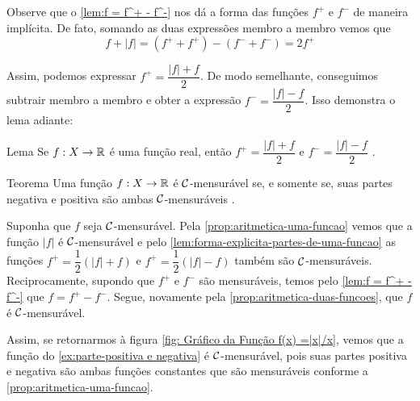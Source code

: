 Observe que o \ref{lem:f = f^+ - f^-} nos dá a forma das funções $f^+$ e $f^-$ de maneira implícita.
De fato, somando as duas expressões membro a membro vemos que
\vspace{-0.2cm}
$$f + |f| = (f^+ + f^+) - (f^- + f^-) = 2f^+$$

\vspace{-0.2cm}
Assim, podemos expressar $f^+ = \dfrac{|f| + f}{2}$.
De modo semelhante, conseguimos subtrair membro a membro e obter a expressão $f^- = \dfrac{|f| - f}{2}$. 
Isso demonstra o lema adiante:
\begin{env}{Lema}
\label{lem:forma-explicita-partes-de-uma-funcao}
    Se $f: X \to \mathbb{R}$ é uma função real, então $f^+ = \dfrac{|f| + f}{2}$ e $f^- = \dfrac{|f| - f}{2}$ \cite{bartle}.
    \vspace{-0.2cm}
\end{env}
\begin{env}{Teorema}
    Uma função $f: X \to \mathbb{R}$ é $\operatorname{\mathcal{C}}$-mensurável se, e somente se, suas partes negativa e positiva são ambas $\operatorname{\mathcal{C}}$-mensuráveis \cite{bartle}. 
    \vspace{-0.2cm}
\end{env}
    \begin{prova}
        Suponha que $f$ seja $\operatorname{\mathcal{C}}$-mensurável.
        Pela  \ref{prop:aritmetica-uma-funcao} vemos que a função $|f|$ é $\operatorname{\mathcal{C}}$-mensurável e pelo \ref{lem:forma-explicita-partes-de-uma-funcao} as funções $f^+ = \dfrac{1}{2}(|f| + f)$ e $f^+ = \dfrac{1}{2}(|f| - f)$ também são $\operatorname{\mathcal{C}}$-mensuráveis.
        Reciprocamente, supondo que $f^+$ e $f^-$ são mensuráveis, temos pelo \ref{lem:f = f^+ - f^-} que
        $f = f^+ - f^-$. Segue, novamente pela \ref{prop:aritmetica-duas-funcoes}, que $f$ é $\operatorname{\mathcal{C}}$-mensurável. 
    \end{prova}

Assim, se retornarmos à figura \ref{fig: Gráfico da Função f(x) =|x|/x}, vemos que a função do  \ref{ex:parte-positiva e negativa} é $\operatorname{\mathcal{C}}$-mensurável, pois
suas partes positiva e negativa são ambas funções constantes que são mensuráveis conforme a \ref{prop:aritmetica-uma-funcao}.
